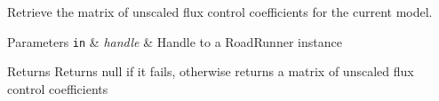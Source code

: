 Retrieve the matrix of unscaled flux control coefficients for the current model. 


\begin{DoxyParams}[1]{Parameters}
\mbox{\tt in}  & {\em handle} & Handle to a Road\-Runner instance \\
\hline
\end{DoxyParams}
\begin{DoxyReturn}{Returns}
Returns null if it fails, otherwise returns a matrix of unscaled flux control coefficients 
\end{DoxyReturn}
